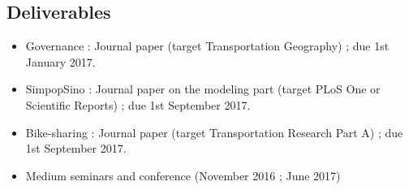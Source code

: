 \subsection{Deliverables}

\begin{itemize}
\item Governance : Journal paper (target Transportation Geography) ; due 1st January 2017.
\item SimpopSino : Journal paper on the modeling part (target PLoS One or Scientific Reports) ; due 1st September 2017.
\item Bike-sharing : Journal paper (target Transportation Research Part A) ; due 1st September 2017.
\item Medium seminars and conference (November 2016 ; June 2017)
\end{itemize}











